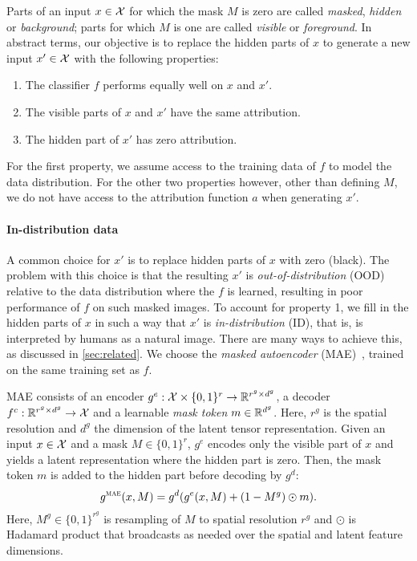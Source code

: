 Parts of an input $x \in \mathcal{X}$ for which the mask $M$ is zero are called \emph{masked}, \emph{hidden} or \emph{background}; parts for which $M$ is one are called \emph{visible} or \emph{foreground}. In abstract terms, our objective is to replace the hidden parts of $x$ to generate a new input $x' \in \mathcal{X}$ with the following properties:
\begin{enumerate}[itemsep=2pt, parsep=0pt, topsep=3pt]
	\item The classifier $f$ performs equally well on $x$ and $x'$.
	\item The visible parts of $x$ and $x'$ have the same attribution.
	\item The hidden part of $x'$ has zero attribution.
\end{enumerate}
For the first property, we assume access to the training data of $f$ to model the data distribution. For the other two properties however, other than defining $M$, we do not have access to the attribution function $a$ when generating $x'$.


\paragraph{In-distribution data}

A common choice for $x'$ is to replace hidden parts of $x$ with zero (black). The problem with this choice is that the resulting $x'$ is \emph{out-of-distribution} (OOD) relative to the data distribution where the $f$ is learned, resulting in poor performance of $f$ on such masked images. To account for property 1, we fill in the hidden parts of $x$ in such a way that $x'$ is \emph{in-distribution} (ID), that is, is interpreted by humans as a natural image. There are many ways to achieve this, as discussed in \autoref{sec:related}. We choose the \emph{masked autoencoder} (MAE)~\citep{9879206}, trained on the same training set as $f$.

MAE consists of an encoder $g^e : \mathcal{X} \times \{0,1\}^r \to \mathbb{R}^{r^g \times d^g}$, a decoder $f^c: \mathbb{R}^{r^g \times d^g} \to \mathcal{X}$ and a learnable \emph{mask token} $m \in \mathbb{R}^{d^g}$. Here, $r^g$ is the spatial resolution and $d^g$ the dimension of the latent tensor representation. Given an input $x \in \mathcal{X}$ and a mask $M \in \{0,1\}^r$, $g^e$ encodes only the visible part of $x$ and yields a latent representation where the hidden part is zero. Then, the mask token $m$ is added to the hidden part before decoding by $g^d$:
\begin{equation}
	g^{\textsc{mae}}(x, M) = g^d(g^e(x, M) + (1-M^g) \odot m).
\label{eq:mae}
\end{equation}
Here, $M^g \in \{0,1\}^{r^g}$ is resampling of $M$ to spatial resolution $r^g$ and $\odot$ is Hadamard product that broadcasts as needed over the spatial and latent feature dimensions.

